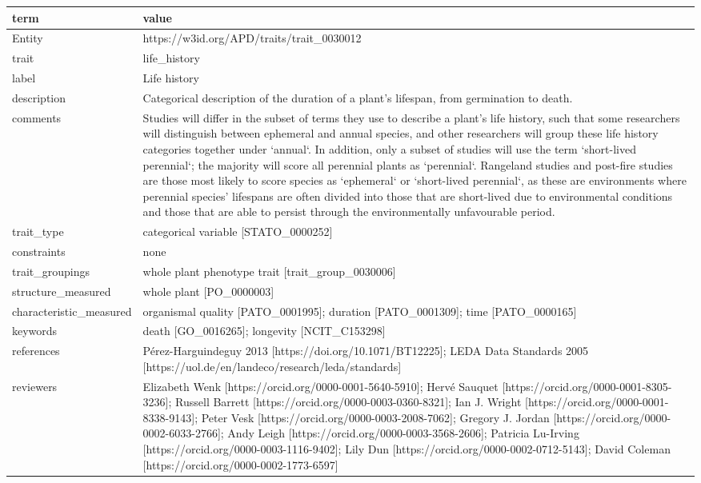 \documentclass[
  letterpaper,
  DIV=11,
  numbers=noendperiod]{scrartcl}
\begin{document}
\begin{longtable*}{>{\raggedright\arraybackslash}p{5cm}>{\raggedright\arraybackslash}p{12cm}}
\toprule
term & value\\
\midrule
Entity & https://w3id.org/APD/traits/trait\_0030012\\
trait & life\_history\\
label & Life history\\
description & Categorical description of the duration of a plant's lifespan, from germination to death.\\
comments & Studies will differ in the subset of terms they use to describe a plant's life history, such that some researchers will distinguish between ephemeral and annual species, and other researchers will group these life history categories together under `annual`. In addition, only a subset of studies will use the term `short-lived perennial`; the majority will score all perennial plants as `perennial`. Rangeland studies and post-fire studies are those most likely to score species as `ephemeral` or `short-lived perennial`, as these are environments where perennial species' lifespans are often divided into those that are short-lived due to environmental conditions and those that are able to persist through the environmentally unfavourable period.\\
\addlinespace
trait\_type & categorical variable [STATO\_0000252]\\
constraints & none\\
trait\_groupings & whole plant phenotype trait [trait\_group\_0030006]\\
structure\_measured & whole plant [PO\_0000003]\\
characteristic\_measured & organismal quality [PATO\_0001995]; duration [PATO\_0001309]; time [PATO\_0000165]\\
\addlinespace
keywords & death [GO\_0016265]; longevity [NCIT\_C153298]\\
references & Pérez-Harguindeguy 2013 [https://doi.org/10.1071/BT12225]; LEDA Data Standards 2005 [https://uol.de/en/landeco/research/leda/standards]\\
reviewers & Elizabeth Wenk [https://orcid.org/0000-0001-5640-5910]; Hervé Sauquet [https://orcid.org/0000-0001-8305-3236]; Russell Barrett [https://orcid.org/0000-0003-0360-8321]; Ian J. Wright [https://orcid.org/0000-0001-8338-9143]; Peter Vesk [https://orcid.org/0000-0003-2008-7062]; Gregory J. Jordan [https://orcid.org/0000-0002-6033-2766]; Andy Leigh [https://orcid.org/0000-0003-3568-2606]; Patricia Lu-Irving [https://orcid.org/0000-0003-1116-9402]; Lily Dun [https://orcid.org/0000-0002-0712-5143]; David Coleman [https://orcid.org/0000-0002-1773-6597]\\

\end{longtable*}
\end{document}
